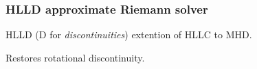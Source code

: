 \documentclass{beamer}
\begin{document}
\begin{frame}[fragile]
\frametitle{HLLD approximate Riemann solver}
\bei
\item HLLD \citep{Miyoshi:2005} (D for \emph{discontinuities}) extention of HLLC to MHD.
\pause
\item Restores rotational discontinuity.

\ebi
\end{frame}

\end{document}

